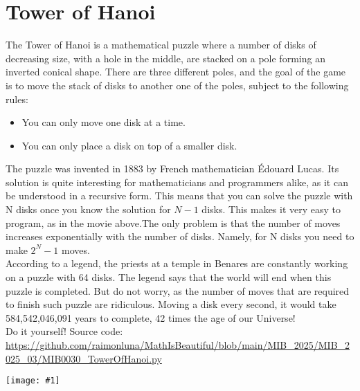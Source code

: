 \documentclass[12pt,landscape]{article}
\newcommand{\artpage}[3][]{%
  \begin{minipage}[t]{0.48\linewidth}
    \vspace{0pt} %
    \section*{#2} %
    \addcontentsline{toc}{section}{#2} %
    #3 %
  \end{minipage}%
  \hfill
  \begin{minipage}[t]{0.48\linewidth}
    \vspace{0pt} %
    \centering
    \texttt{[image: \#1]}
  \end{minipage}%
  \newpage
}
\begin{document}
\artpage[../Output/LowQuality/MIB0030_TowerOfHanoi.png]{Tower of Hanoi}{%
The Tower of Hanoi is a mathematical puzzle where a number of disks of decreasing size, with a hole in the middle, are stacked on a pole forming an inverted conical shape. There are three different poles, and the goal of the game is to move the stack of disks to another one of the poles, subject to the following rules:

\begin{itemize}
  \item You can only move one disk at a time.
  \item You can only place a disk on top of a smaller disk.
\end{itemize}

The puzzle was invented in 1883 by French mathematician Édouard Lucas. Its solution is quite interesting for mathematicians and programmers alike, as it can be understood in a recursive form. This means that you can solve the puzzle with N disks once you know the solution for $N-1$ disks. This makes it very easy to program, as in the movie above.The only problem is that the number of moves increases exponentially with the number of disks. Namely, for N disks you need to make $2^N - 1$ moves. \\

According to a legend, the priests at a temple in Benares are constantly working on a puzzle with 64 disks. The legend says that the world will end when this puzzle is completed. But do not worry, as the number of moves that are required to finish such puzzle are ridiculous. Moving a disk every second, it would take 584,542,046,091 years to complete, 42 times the age of our Universe!\\

Do it yourself! Source code: \url{https://github.com/raimonluna/MathIsBeautiful/blob/main/MIB_2025/MIB_2025_03/MIB0030_TowerOfHanoi.py}
}
\end{document}

